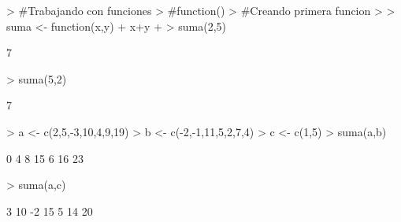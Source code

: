 \documentclass{article}
\begin{document}


\begin{Schunk}
\begin{Sinput}
> #Trabajando con funciones 
> #function(){}
> #Creando primera funcion 
> 
> suma <- function(x,y){
+   x+y
+ }
> suma(2,5)
\end{Sinput}
\begin{Soutput}
[1] 7
\end{Soutput}
\begin{Sinput}
> suma(5,2)
\end{Sinput}
\begin{Soutput}
[1] 7
\end{Soutput}
\begin{Sinput}
> a <- c(2,5,-3,10,4,9,19)
> b <- c(-2,-1,11,5,2,7,4)
> c <- c(1,5)
> suma(a,b)
\end{Sinput}
\begin{Soutput}
[1]  0  4  8 15  6 16 23
\end{Soutput}
\begin{Sinput}
> suma(a,c)
\end{Sinput}
\begin{Soutput}
[1]  3 10 -2 15  5 14 20
\end{Soutput}
\end{Schunk}
\end{document}
